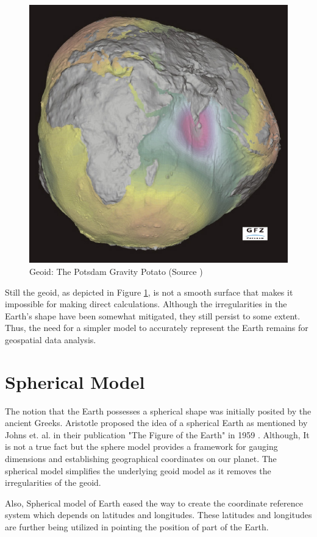 \begin{figure}[h]
    \centering
    \includegraphics[width=0.7\linewidth]{figures/chapter-2/geoid.jpg}
    \caption{Geoid: The Potsdam Gravity Potato (Source \cite{GEOID_IMAGE}) }
    \label{fig:geoid-image}
\end{figure}

Still the geoid, as depicted in Figure \ref{fig:geoid-image}, is not a smooth surface that makes it impossible for making direct calculations.
Although the irregularities in the Earth's shape have been somewhat mitigated, they still persist to some extent. Thus, the need for a simpler model to accurately
represent the Earth remains for geospatial data analysis.


\section{Spherical Model}

The notion that the Earth possesses a spherical shape was initially posited by the ancient Greeks. Aristotle proposed the idea of a spherical Earth as
mentioned by Johns et. al. in their publication "The Figure of the Earth" in 1959 \cite{Johns1959-og}.
Although, It is not a true fact but the sphere model provides a framework for gauging dimensions and establishing geographical coordinates on our planet.
The spherical model simplifies the underlying geoid model as it removes the irregularities of the geoid.

Also, Spherical model of Earth eased the way to create the coordinate reference system which depends on latitudes and longitudes.
These latitudes and longitudes are further being utilized in pointing the position of part of the Earth.

